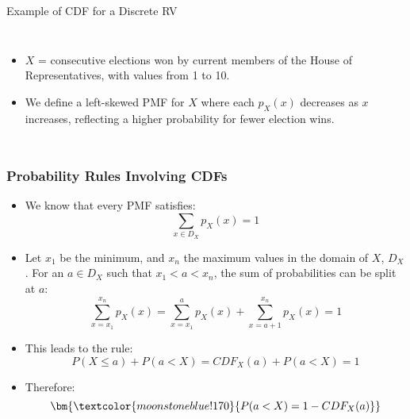 \documentclass[handout]{beamer} %
\begin{document}
\begin{frame}{Example of CDF for a Discrete RV}

\begin{columns}

\footnotesize
\begin{itemize}
  \item \(X\) =  consecutive elections won by current members of the House of Representatives, with values from 1 to 10.
  \pause
  \item We define a left-skewed PMF for \(X\) where each \(p_X(x)\) decreases as \(x\) increases, reflecting a higher probability for fewer election wins.
  \pause
\end{itemize}


\end{columns}
    
\end{frame}

\begin{frame}
\frametitle{Probability Rules Involving CDFs}
\small 
\begin{itemize}
  \setlength{\itemsep}{-10pt} %
  \item We know that every PMF satisfies:
  \[
  \sum_{x \in D_X } p_X(x) = 1
  \]
  \pause
  \item Let $x_1$ be the minimum, and $x_n$ the maximum values in the domain of $X$, $D_X$. For an $a\in D_X$ such that $x_1 < a < x_n$, the sum of probabilities can be split at $a$:
  \[
  \sum_{x=x_1}^{x_n} p_X(x) = \sum_{x=x_1}^{a} p_X(x) + \sum_{x=a+1}^{x_n} p_X(x) = 1
  \]
  \pause
  \item This leads to the rule:
  \[
  P(X \leq a) + P(a < X) = CDF_X(a) + P(a < X) = 1
  \]
  \pause
  \item Therefore:
  \[
  \bm{ \textcolor{moonstoneblue!170}{P(a< X) = 1 - CDF_X(a)}}  
  \]
\end{itemize}

\end{frame}
\end{document}
